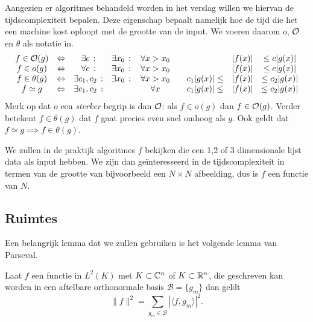 Aangezien er algoritmes behandeld worden in het verslag willen we hiervan de tijdscomplexiteit bepalen.
Deze eigenschap bepaalt namelijk hoe de tijd die het een machine kost oploopt met de grootte van de input.
We voeren daarom $o$, $\mathcal{O}$ en $\theta$ als notatie in.
\begin{equation*}
\begin{array}{cccccccc}
  f \in \mathcal{O}(g)     &\Leftrightarrow& \exists c     \,:&\exists x_0  \,:&\, 
  \forall x>x_0 \quad&& |f(x)| &\leq c|g(x)|  \\
  f \in o(g)      &\Leftrightarrow& \forall c     \,:&\exists x_0  \,:&\, 
  \forall x>x_0 \quad&& |f(x)| &\leq c |g(x)| \\ 
  f \in \theta(g) &\Leftrightarrow& \exists c_1,c_2\,:&\exists x_0  \,:&\, 
  \forall x>x_0 \quad& c_1|g(x)| \leq & |f(x)| &\leq c_2|g(x)|  \\
  f \simeq g & \Leftrightarrow& \exists c_1,c_2\,:& \,&\, 
  \forall x \quad& c_1|g(x)| \leq & |f(x)| &\leq c_2|g(x)| 

\end{array}
\end{equation*}
Merk op dat $o$ een \emph{sterker} begrip is dan $\mathcal{O}$: als $f \in o(g)$ dan $f \in \mathcal{O}(g)$. Verder betekent $f \in \theta(g)$ dat $f$ gaat precies even snel omhoog als $g$. Ook geldt dat $f\simeq g \implies f\in\theta(g)$.

We zullen in de praktijk algoritmes $f$ bekijken die een 1,2 of 3 dimensionale lijst data als input hebben.
We zijn dan ge\"interesseerd in de tijdscomplexiteit in termen van de grootte van bijvoorbeeld een $N\times N$ 
afbeelding, dus is $f$ een functie van $N$.

\subsection{Ruimtes}
Een belangrijk lemma dat we zullen gebruiken is het volgende lemma van Parseval.
\begin{lemm}
  \label{parseval}
  Laat $f$ een functie in $L^2(K)$ met $K \subset \mathbb{C}^n$ of $K\subset\mathbb{R}^n$, die geschreven kan worden in een aftelbare 
  orthonormale basis $\mathcal{B}=\{g_m\}$ dan geldt
  \[
  \|f\|^2 = \sum_{g_m\in\mathcal{B}} | \langle f, g_m \rangle |^2.
  \]
\end{lemm}

